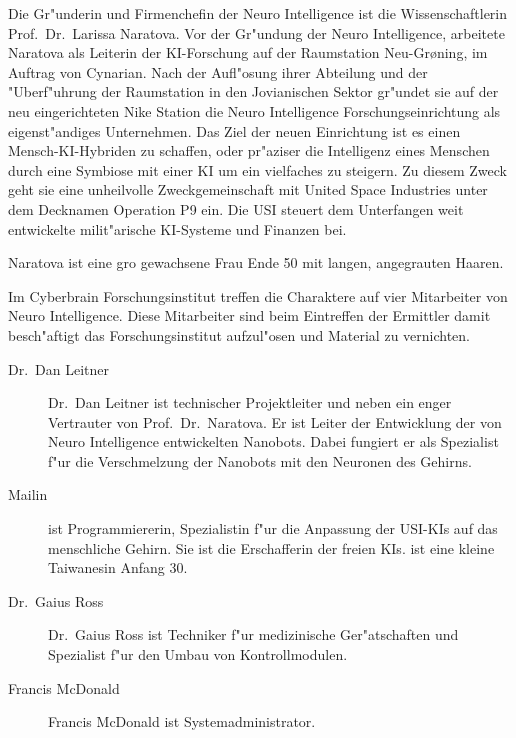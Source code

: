 \renewcommand{\ml}{\pinyin{Mailin2}}


Die Gr"underin und Firmenchefin der Neuro Intelligence ist die Wissenschaftlerin Prof.~Dr.~Larissa Naratova. Vor der Gr"undung der Neuro Intelligence, arbeitete Naratova als Leiterin der KI-Forschung auf der Raumstation Neu-Gr{\o}ning, im Auftrag von Cynarian. Nach der Aufl"osung ihrer Abteilung und der "Uberf"uhrung der Raumstation in den Jovianischen Sektor gr"undet sie auf der neu eingerichteten Nike Station die Neuro Intelligence Forschungseinrichtung als eigenst"andiges Unternehmen. Das Ziel der neuen Einrichtung ist es einen Mensch-KI-Hybriden zu schaffen, oder pr"aziser die Intelligenz eines Menschen durch eine Symbiose mit einer KI um ein vielfaches zu steigern. Zu diesem Zweck  geht sie eine unheilvolle Zweckgemeinschaft mit United Space Industries unter dem Decknamen Operation P9 ein. Die USI steuert dem Unterfangen weit entwickelte milit"arische KI-Systeme und Finanzen bei.

Naratova ist eine gro\3 gewachsene Frau Ende 50 mit langen, angegrauten Haaren. 


Im Cyberbrain Forschungsinstitut treffen die Charaktere auf vier Mitarbeiter von Neuro Intelligence. Diese Mitarbeiter sind beim Eintreffen der Ermittler damit besch"aftigt das Forschungsinstitut aufzul"osen und Material zu vernichten.

\begin{description}
    \item[Dr.~Dan Leitner] Dr.~Dan Leitner ist technischer Projektleiter und neben \ml{} ein enger Vertrauter von Prof.~Dr.~Naratova. 
        Er ist Leiter der Entwicklung der von Neuro Intelligence entwickelten Nanobots. Dabei fungiert er als Spezialist f"ur die Verschmelzung der Nanobots mit den Neuronen des Gehirns.
    \item[Mailin] \ml{} ist Programmiererin, Spezialistin f"ur die Anpassung der USI-KIs auf das menschliche Gehirn. Sie ist die 
        Erschafferin der freien KIs. \ml{} ist eine kleine Taiwanesin Anfang 30.
    \item[Dr.~Gaius Ross] Dr.~Gaius Ross ist Techniker f"ur medizinische Ger"atschaften und Spezialist f"ur den Umbau von Kontrollmodulen.
    \item[Francis McDonald] Francis McDonald ist Systemadministrator.
\end{description}

